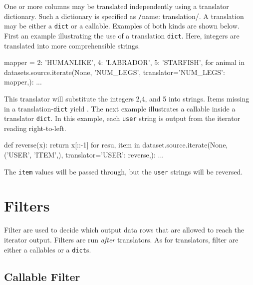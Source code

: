 One or more columns may be translated independently using a translator
dictionary.  Such a dictionary is specified
as \texttt/{name: translation}/.  A translation may be
either a \texttt{dict} or a callable.  Examples of both kinds are
shown below.  First an example illustrating the use of a
translation \texttt{dict}.  Here, integers are translated into more
comprehensible strings.
\begin{python}
mapper = {2: 'HUMANLIKE', 4: 'LABRADOR', 5: 'STARFISH',}
for animal in datasets.source.iterate(None, 'NUM_LEGS',
                                      translator={'NUM_LEGS': mapper,}):
    ...
\end{python}
This translator will substitute the integers 2,4, and 5 into strings.
Items missing in a translation-\texttt{dict} yield \pyNone.  The next
example illustrates a callable inside a translator \texttt{dict}.  In
this example, each \texttt{user} string is output from the iterator
reading right-to-left.
\begin{python}
def reverse(x):
    return x[::-1]
for resu, item in dataset.source.iterate(None, ('USER', 'ITEM',),
                                         translator={'USER': reverse,}):
    ...
\end{python}
The \texttt{item} values will be passed through, but the \texttt{user}
strings will be reversed.



\section{Filters}
\label{sec:filters}

Filter are used to decide which output data rows that are allowed to
reach the iterator output.  Filters are run \emph{after} translators.
As for translators, filter are either a callables or a \texttt{dict}s.




\subsection*{Callable Filter}

